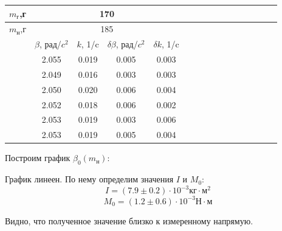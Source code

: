 \documentclass[14pt]{article}
\begin{document}
\begin{center}
\begin{tabular}{|c|c|c|c|c|c|c|c|c|c|c|c|c|c|c|c|}
\hline
$m_\text{г}$,г	&\multicolumn{4}{|c|}{170}			\\
\hline
$m_\text{н}$,г	&\multicolumn{4}{|c|}{185}		\\
\hline
				&	$\beta$, рад/$c^2$		&	$k$, 1/c		&	$\delta\beta$, рад/$c^2$		&	$\delta k$, 1/c			\\
\hline
				&	2.055					&	0.019			&	0.005							&	0.003					\\
\hline
				&	2.049					&	0.016			&	0.003							&	0.003					\\
\hline
				&	2.050					&	0.020			&	0.006							&	0.004					\\
\hline
				&	2.052					&	0.018			&	0.006							&	0.002					\\
\hline
				&	2.053					&	0.019			&	0.003							&	0.006					\\
\hline
				&	2.053					&	0.019			&	0.005							&	0.004					\\
\hline
\end{tabular}
\end{center}

\vspace{1cm}
Построим график $\beta_0(m_\text{н})$:

\vspace{1cm}
\begin{flushleft}
\end{flushleft}

\vspace{1cm}
График линеен. По нему определим значения $I$ и $M_0$:
$$I = (7.9 \pm 0.2) \cdot 10^{-3} \text{кг}\cdot\text{м}^2$$
$$M_0 = (1.2 \pm 0.6)\cdot 10^{-3} \text{Н}\cdot\text{м}$$

Видно, что полученное значение близко к измеренному напрямую.	
\end{document}

